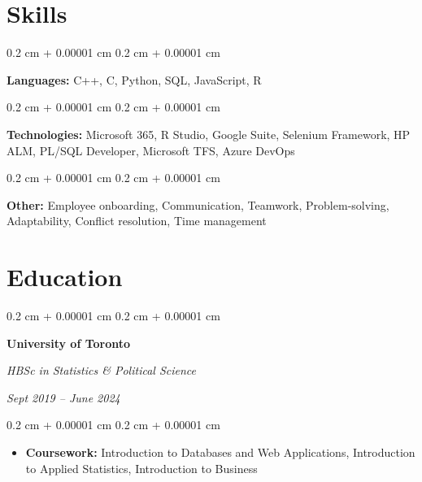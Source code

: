 \documentclass[10pt, letterpaper]{article}
\newenvironment{highlights}{
    \begin{itemize}[
        topsep=0.10 cm,
        parsep=0.10 cm,
        partopsep=0pt,
        itemsep=0pt,
        leftmargin=0.4 cm + 10pt
    ]
}{
    \end{itemize}
} %
\newenvironment{onecolentry}{
    \begin{adjustwidth}{
        0.2 cm + 0.00001 cm
    }{
        0.2 cm + 0.00001 cm
    }
}{
    \end{adjustwidth}
} %
\newenvironment{twocolentry}[2][]{
    \onecolentry
    \def\secondColumn{#2}
    \setcolumnwidth{\fill, 4.5 cm}
    \begin{paracol}{2}
}{
    \switchcolumn \raggedleft \secondColumn
    \end{paracol}
    \endonecolentry
} %
\begin{document}
    
    \section{Skills}



        
        \begin{onecolentry}
            \textbf{Languages:} C++, C, Python, SQL, JavaScript, R
        \end{onecolentry}

        \vspace{0.2 cm}

        \begin{onecolentry}
            \textbf{Technologies:} Microsoft 365, R Studio, Google Suite, Selenium Framework, HP ALM, PL/SQL Developer, Microsoft TFS, Azure DevOps
        \end{onecolentry}

        \vspace{0.2 cm}

        \begin{onecolentry}
            \textbf{Other:} Employee onboarding, Communication, Teamwork, Problem-solving, Adaptability, Conflict resolution, Time management
        \end{onecolentry}


    
    \section{Education}



        
        \begin{twocolentry}{
            
            
        \textit{Sept 2019 – June 2024}}
            \textbf{University of Toronto}

            \textit{HBSc in Statistics \& Political Science}
        \end{twocolentry}

        \vspace{0.10 cm}
        \begin{onecolentry}
            \begin{highlights}
                \item \textbf{Coursework:} Introduction to Databases and Web Applications, Introduction to Applied Statistics, Introduction to Business
            \end{highlights}
        \end{onecolentry}
\end{document}
